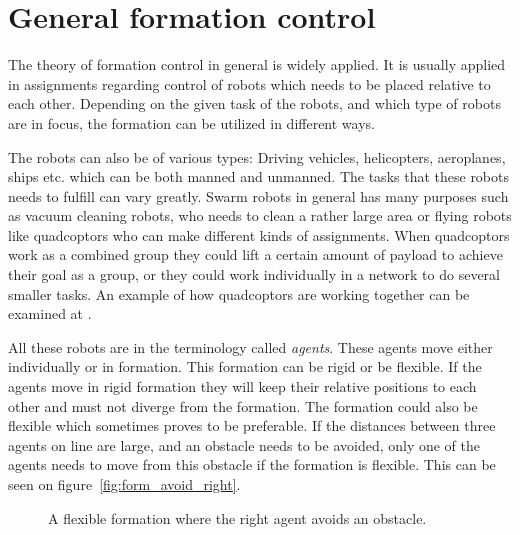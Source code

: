 \section{General formation control}



The theory of formation control in general is widely applied. It is usually applied in assignments regarding control of robots which needs to be placed relative to each other. Depending on the given task of the robots, and which type of robots are in focus, the formation can be utilized in different ways.

The robots can also be of various types: Driving vehicles, helicopters, aeroplanes, ships etc. which can be both manned and unmanned. The tasks that these robots needs to fulfill can vary greatly. Swarm robots in general has many purposes such as vacuum cleaning robots, who needs to clean a rather large area or flying robots like quadcoptors who can make different kinds of assignments. When quadcoptors work as a combined group they could lift a certain amount of payload to achieve their goal as a group, or they could work individually in a network to do several smaller tasks. An example of how quadcoptors are working together can be examined at \citep{ethswarm}.

All these robots are in the terminology called \textit{agents}. These agents move either individually or in formation. This formation can be rigid or be flexible. If the agents move in rigid formation they will keep their relative positions to each other and must not diverge from the formation. The formation could also be flexible which sometimes proves to be preferable. If the distances between three agents on line are large, and an obstacle needs to be avoided, only one of the agents needs to move from this obstacle if the formation is flexible. This can be seen on figure~\vref{fig:form_avoid_right}. 
\begin{figure}[htbp]
	\centering
	
	\caption{A flexible formation where the right agent avoids an obstacle.}
	\label{fig:form_avoid_right}
\end{figure}

